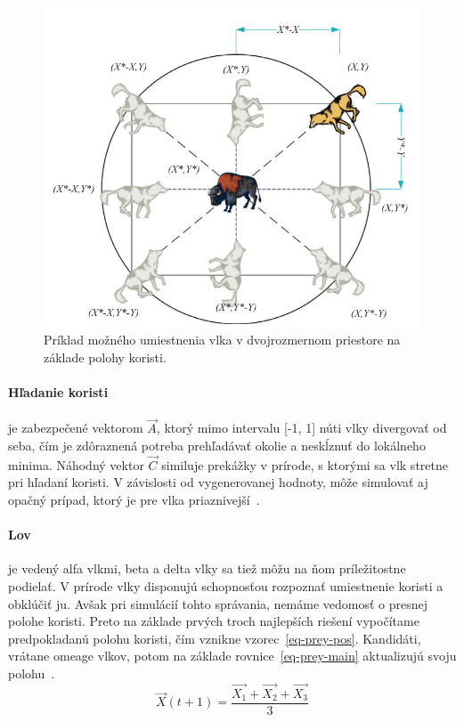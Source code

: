 \documentclass[a4paper,slovak,12pt,appendix]{article}
\begin{document}
\begin{figure}[ht]
  \centering
  \includegraphics[width=\textwidth]{wolf_vector_positions.png}
  \caption{Príklad možného umiestnenia vlka v dvojrozmernom priestore na základe polohy koristi.}
  \label{fig-wolf-pos}
\end{figure}

\paragraph{Hľadanie koristi} je zabezpečené vektorom $\vec{A}$, ktorý mimo
intervalu [-1, 1] núti vlky divergovať od seba, čím je zdôraznená potreba
prehľadávať okolie a neskĺznuť do lokálneho minima. Náhodný vektor $\vec{C}$
similuje prekážky v prírode, s ktorými sa vlk stretne pri hľadaní koristi.
V závislosti od vygenerovanej hodnoty, môže simulovať aj opačný prípad, ktorý
je pre vlka priaznivejší~\cite{Seeley1991}.

\paragraph{Lov} je vedený alfa vlkmi, beta a delta vlky sa tiež môžu na ňom
príležitostne podielať. V prírode vlky disponujú schopnosťou rozpoznať
umiestnenie koristi a obklúčiť ju. Avšak pri simulácií tohto správania, nemáme
vedomosť o presnej polohe koristi. Preto na základe prvých troch najlepších
riešení vypočítame predpokladanú polohu koristi, čím vznikne
vzorec~\ref{eq-prey-pos}. Kandidáti, vrátane omeage vlkov, potom na základe
rovnice~\ref{eq-prey-main} aktualizujú svoju polohu~\cite{Seeley1991}.
\begin{equation}
  \vec{X}(t+1) = \frac{\vec{X_1} + \vec{X_2} + \vec{X_3}}{3}
  \label{eq-prey-pos}
\end{equation}
\end{document}
